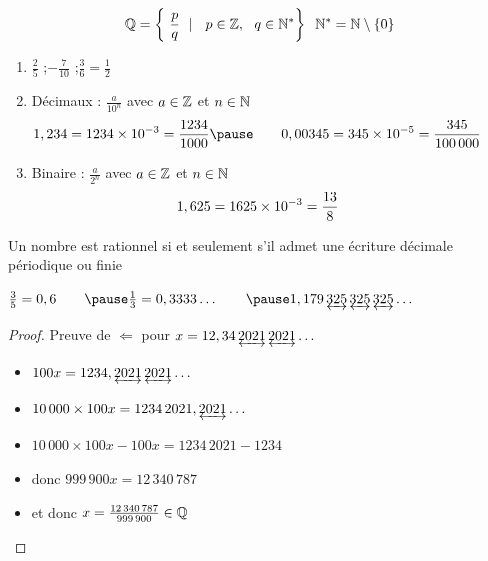 \begin{frame}

\begin{mydefinition}
	\[
\Qq = \left\{ \ \frac{p}{q}  \ \mid\ \   p\in \Zz,\ \  q\in \Nn^*\right\}
\;\;\Nn^*=\Nn\setminus\left\{ 0 \right\}\]
\end{mydefinition}
\pause
\begin{exemple}
	\begin{enumerate}
		\item $\displaystyle \frac25$ \quad;\quad $\displaystyle-\frac{7}{10}$ \quad;\quad $\displaystyle\frac36=\frac12$
\pause
		\item Décimaux : $\displaystyle\frac{a}{10^n}$ \quad
avec $a\in \mathbb{Z}$ et $n\in \mathbb{N}$
\pause
$$\hspace*{-2em}1,234=1234\times 10^{-3}=\frac{1234}{1000}
\pause\qquad 0,00345=345\times 10^{-5}=\frac{345}{100\,000}$$
		\item Binaire : $\displaystyle\frac{a}{2^n}$ \quad
avec $a\in \mathbb{Z}$ et $n\in \mathbb{N}$
\pause
$$\hspace*{-2em}1,625=1625\times 10^{-3}=\frac{13}{8}
$$
\end{enumerate}

\end{exemple}

\end{frame}



\begin{frame}

\begin{proposition}
Un nombre est rationnel si et seulement s'il admet une écriture décimale périodique ou finie
\end{proposition}\pause

	

\begin{exemple}
$\frac{3}{5}=0,6\qquad\pause \frac{1}{3}=0,3333\ldots \qquad \pause
1,179\,\underleftrightarrow{325}\,\underleftrightarrow{325}\,\underleftrightarrow{325}\ldots $
\end{exemple}\pause


\begin{proof}
Preuve de $\Longleftarrow$ pour $x = 12,34\,\underleftrightarrow{2021}\,\underleftrightarrow{2021}\ldots$
\pause

\begin{itemize}
\setlength{\itemsep}{6pt}
 \item $100x = 1234,\underleftrightarrow{2021}\,\underleftrightarrow{2021}\ldots$
\pause
 \item $10\,000 \times 100  x = 1234 \, 2021,\underleftrightarrow{2021}\ldots$
\pause
 \item $10\,000 \times 100 x-100x=1234 \, 2021-1234$
\pause
 \item donc $999\,900x=12\,340\,787$
\pause
 \item et donc $x=\frac{12\,340\,787}{999\,900}\in\mathbb{Q}$
\end{itemize}
\vspace*{-3ex}
\end{proof}
\end{frame}

